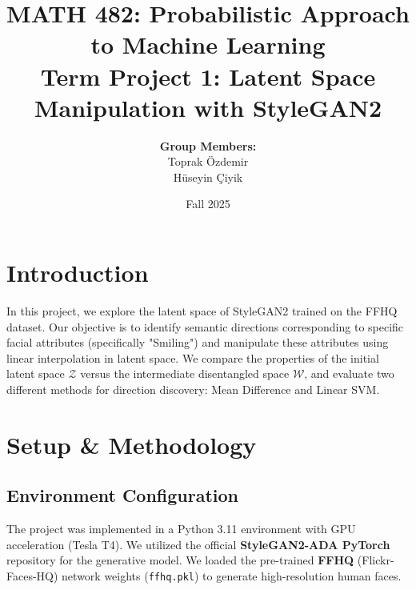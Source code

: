 \documentclass[12pt, a4paper]{article}
\title{
    \large \textbf{MATH 482: Probabilistic Approach to Machine Learning} \\
    \normalsize Term Project 1: Latent Space Manipulation with StyleGAN2
}
\author{
    \large \textbf{Group Members:} \\
    \large Toprak Özdemir \\
    \large Hüseyin Çiyik
}
\date{Fall 2025}
\begin{document}
\maketitle
\tableofcontents

\section{Introduction}
In this project, we explore the latent space of StyleGAN2 trained on the FFHQ dataset. Our objective is to identify semantic directions corresponding to specific facial attributes (specifically "Smiling") and manipulate these attributes using linear interpolation in latent space. We compare the properties of the initial latent space $\mathcal{Z}$ versus the intermediate disentangled space $\mathcal{W}$, and evaluate two different methods for direction discovery: Mean Difference and Linear SVM.

\section{Setup \& Methodology}

\subsection{Environment Configuration}
The project was implemented in a Python 3.11 environment with GPU acceleration (Tesla T4). We utilized the official \textbf{StyleGAN2-ADA PyTorch} repository for the generative model. We loaded the pre-trained \textbf{FFHQ} (Flickr-Faces-HQ) network weights (\texttt{ffhq.pkl}) to generate high-resolution human faces.
\end{document}
